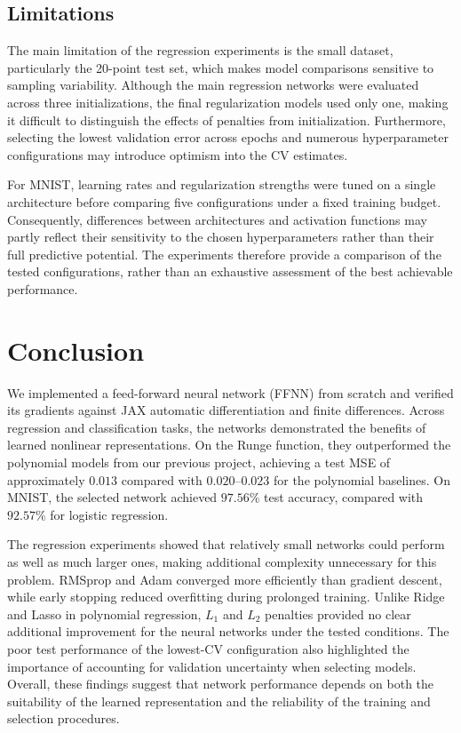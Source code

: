 \documentclass[amssymb,twocolumn,aps]{revtex4}
\begin{document}
\subsection{Limitations}
The main limitation of the regression experiments is the small dataset, particularly the 20-point test set, which makes model comparisons sensitive to sampling variability. Although the main regression networks were evaluated across three initializations, the final regularization models used only one, making it difficult to distinguish the effects of penalties from initialization. Furthermore, selecting the lowest validation error across epochs and numerous hyperparameter configurations may introduce optimism into the CV estimates.

For MNIST, learning rates and regularization strengths were tuned on a single architecture before comparing five configurations under a fixed training budget. Consequently, differences between architectures and activation functions may partly reflect their sensitivity to the chosen hyperparameters rather than their full predictive potential. The experiments therefore provide a comparison of the tested configurations, rather than an exhaustive assessment of the best achievable performance.

\section{Conclusion}\label{sec:conclusion}
We implemented a feed-forward neural network (FFNN) from scratch and verified its gradients against JAX automatic differentiation and finite differences. Across regression and classification tasks, the networks demonstrated the benefits of learned nonlinear representations. On the Runge function, they outperformed the polynomial models from our previous project, achieving a test MSE of approximately $0.013$ compared with $0.020$–$0.023$ for the polynomial baselines. On MNIST, the selected network achieved $97.56\%$ test accuracy, compared with $92.57\%$ for logistic regression.

The regression experiments showed that relatively small networks could perform as well as much larger ones, making additional complexity unnecessary for this problem. RMSprop and Adam converged more efficiently than gradient descent, while early stopping reduced overfitting during prolonged training. Unlike Ridge and Lasso in polynomial regression, $L_1$ and $L_2$ penalties provided no clear additional improvement for the neural networks under the tested conditions. The poor test performance of the lowest-CV configuration also highlighted the importance of accounting for validation uncertainty when selecting models. Overall, these findings suggest that network performance depends on both the suitability of the learned representation and the reliability of the training and selection procedures.
\end{document}
